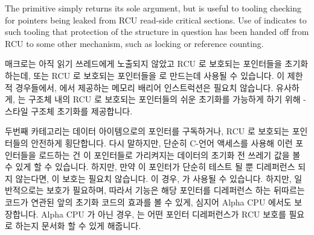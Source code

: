 The  primitive simply returns its sole argument,
but is useful to tooling checking for pointers being leaked from
RCU read-side critical sections.
Use of  indicates to such tooling that protection
of the structure in question has been handed off from RCU to some other
mechanism, such as locking or reference counting.
\fi

 매크로는 아직 읽기 쓰레드에게 노출되지 않았고 RCU 로
보호되는 포인터들을 초기화하는데, 또는 RCU 로 보호되는 포인터들을  로
만드는데 사용될 수 있습니다.
이 제한적 경우들에서,  에서 제공하는 메모리 배리어
인스트럭션은 필요치 않습니다.
유사하게,  는 구조체 내의 RCU 로 보호되는
포인터들의 쉬운 초기화를 가능하게 하기 위해 \GCC-스타일 구조체 초기화를
제공합니다.

두번째 카테고리는 데이터 아이템으로의 포인터를 구독하거나, RCU 로 보호되는
포인터들의 안전하게 횡단합니다.
다시 말하지만, 단순히 C-언어 액세스를 사용해 이런 포인터들을 로드하는 건 이
포인터들로 가리켜지는 데이터의 초기화 전 쓰레기 값을 볼 수 있게 할 수 있습니다.
하지만, 만약 이 포인터가 단순히 테스트 될 뿐 디레퍼런스 되지 않는다면, 이
보호는 필요치 않습니다.
이 경우,  가 사용될 수 있습니다.
하지만, 일반적으로는 보호가 필요하며, 따라서  기능은 해당
포인터를 디레퍼런스 하는 뒤따르는 코드가 연관된  앞의
초기화 코드의 효과를 볼 수 있게, 심지어 Alpha CPU 에서도 보장합니다.
Alpha CPU 가 아닌 경우,  는 어떤 포인터 디레퍼런스가 RCU
보호를 필요로 하는지 문서화 할 수 있게 해줍니다.

